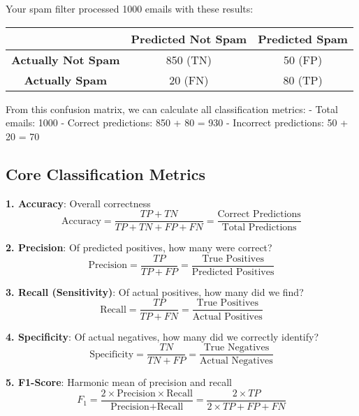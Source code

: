 \documentclass{article}
\newcounter{example}
\begin{document}
\begin{tcolorbox}[colback=orange!5!white,colframe=orange!75!black,title=Example \stepcounter{example}\#\theexample: Email Spam Detection]
Your spam filter processed 1000 emails with these results:

\begin{center}
\begin{tabular}{|c|c|c|}
\hline
& \textbf{Predicted Not Spam} & \textbf{Predicted Spam} \\
\hline
\textbf{Actually Not Spam} & 850 (TN) & 50 (FP) \\
\hline
\textbf{Actually Spam} & 20 (FN) & 80 (TP) \\
\hline
\end{tabular}
\end{center}

From this confusion matrix, we can calculate all classification metrics:
- Total emails: 1000
- Correct predictions: 850 + 80 = 930
- Incorrect predictions: 50 + 20 = 70
\end{tcolorbox}

\subsection{Core Classification Metrics}

\textbf{1. Accuracy}: Overall correctness
$$\text{Accuracy} = \frac{TP + TN}{TP + TN + FP + FN} = \frac{\text{Correct Predictions}}{\text{Total Predictions}}$$

\textbf{2. Precision}: Of predicted positives, how many were correct?
$$\text{Precision} = \frac{TP}{TP + FP} = \frac{\text{True Positives}}{\text{Predicted Positives}}$$

\textbf{3. Recall (Sensitivity)}: Of actual positives, how many did we find?
$$\text{Recall} = \frac{TP}{TP + FN} = \frac{\text{True Positives}}{\text{Actual Positives}}$$

\textbf{4. Specificity}: Of actual negatives, how many did we correctly identify?
$$\text{Specificity} = \frac{TN}{TN + FP} = \frac{\text{True Negatives}}{\text{Actual Negatives}}$$

\textbf{5. F1-Score}: Harmonic mean of precision and recall
$$F_1 = \frac{2 \times \text{Precision} \times \text{Recall}}{\text{Precision} + \text{Recall}} = \frac{2 \times TP}{2 \times TP + FP + FN}$$
\end{document}
